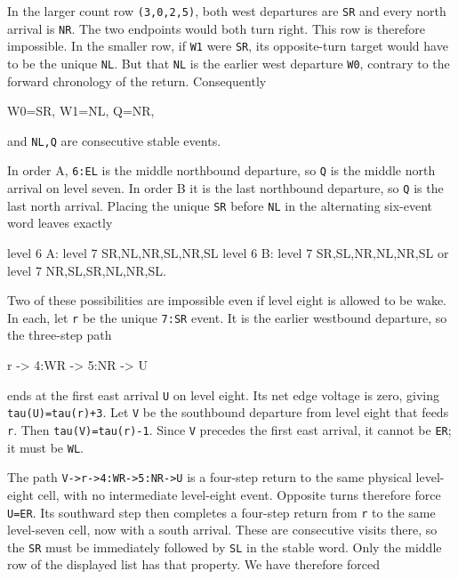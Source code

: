 \documentclass[11pt,letterpaper]{article}
\theoremstyle{plain}
\theoremstyle{definition}
\begin{document}
\begin{NoHyper}
In the larger count row \texttt{(3,0,2,5)}, both west departures are \texttt{SR} and every north arrival is \texttt{NR}. The two endpoints would both turn right. This row is therefore impossible. In the smaller row, if \texttt{W1} were \texttt{SR}, its opposite-turn target would have to be the unique \texttt{NL}. But that \texttt{NL} is the earlier west departure \texttt{W0}, contrary to the forward chronology of the return. Consequently

\begin{codeblock}
W0=SR,       W1=NL,       Q=NR,
\end{codeblock}

and \texttt{NL,Q} are consecutive stable events.

In order A, \texttt{6:EL} is the middle northbound departure, so \texttt{Q} is the middle north arrival on level seven. In order B it is the last northbound departure, so \texttt{Q} is the last north arrival. Placing the unique \texttt{SR} before \texttt{NL} in the alternating six-event word leaves exactly

\begin{codeblock}
level 6 A:  level 7 SR,NL,NR,SL,NR,SL
level 6 B:  level 7 SR,SL,NR,NL,NR,SL
         or level 7 NR,SL,SR,NL,NR,SL.
\end{codeblock}

Two of these possibilities are impossible even if level eight is allowed to be wake. In each, let \texttt{r} be the unique \texttt{7:SR} event. It is the earlier westbound departure, so the three-step path

\begin{codeblock}
r -> 4:WR -> 5:NR -> U
\end{codeblock}

ends at the first east arrival \texttt{U} on level eight. Its net edge voltage is zero, giving \texttt{tau(U)=tau(r)+3}. Let \texttt{V} be the southbound departure from level eight that feeds \texttt{r}. Then \texttt{tau(V)=tau(r)-1}. Since \texttt{V} precedes the first east arrival, it cannot be \texttt{ER}; it must be \texttt{WL}.

The path \texttt{V-\textgreater{}r-\textgreater{}4:WR-\textgreater{}5:NR-\textgreater{}U} is a four-step return to the same physical level-eight cell, with no intermediate level-eight event. Opposite turns therefore force \texttt{U=ER}. Its southward step then completes a four-step return from \texttt{r} to the same level-seven cell, now with a south arrival. These are consecutive visits there, so the \texttt{SR} must be immediately followed by \texttt{SL} in the stable word. Only the middle row of the displayed list has that property. We have therefore forced


\end{NoHyper}
\end{document}
